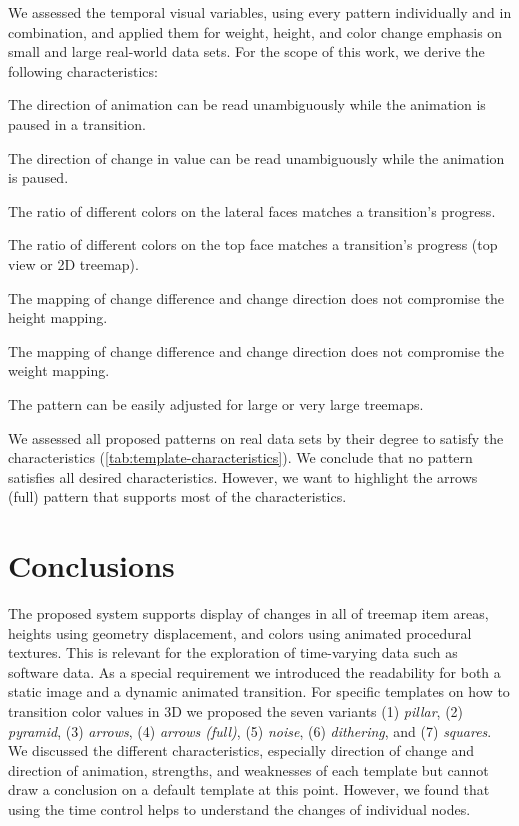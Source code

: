 \documentclass[sigconf%
,natbib=true%
]{acmart}
\begin{document}
We assessed the temporal visual variables, using every pattern individually and in combination, and applied them for weight, height, and color change emphasis on small and large real-world data sets.
For the scope of this work, we derive the following characteristics:
\newlength{\maxlabel}
\begin{description}[itemindent=0mm,labelwidth=20mm,leftmargin=\maxlabel,align=right,itemsep=1mm]
    \item [$\Delta_{\textrm{DirAnim}}$]
        The direction of animation can be read unambiguously while the animation is paused in a transition.
    \item [$\Delta_{\textrm{DirChange}}$]
        The direction of change in value can be read unambiguously while the animation is paused.
    \item [$\Delta_{\textrm{RatioLat}}$]
        The ratio of different colors on the lateral faces matches a transition's progress.
    \item [$\Delta_{\textrm{RatioTop}}$]
        The ratio of different colors on the top face matches a transition's progress (top view or 2D treemap).
    \item [$\Delta_{\textrm{IndHeight}}$]
        The mapping of change difference and change direction does not compromise the height mapping.
    \item [$\Delta_{\textrm{IndWeight}}$]
        The mapping of change difference and change direction does not compromise the weight mapping.
    \item [$\Delta_{\textrm{TreeSize}}$]
        The pattern can be easily adjusted for large or very large treemaps.
\end{description}
We assessed all proposed patterns on real data sets by their degree to satisfy the characteristics (\autoref{tab:template-characteristics}).
We conclude that no pattern satisfies all desired characteristics.
However, we want to highlight the arrows (full) pattern that supports most of the characteristics.

\section{Conclusions} 
The proposed system supports display of changes in all of treemap item areas, heights using geometry displacement, and colors using animated procedural textures.
This is relevant for the exploration of time-varying data such as software data.
As a special requirement we introduced the readability for both a static image and a dynamic animated transition.
For specific templates on how to transition color values in 3D we proposed the seven variants (1) \emph{pillar}, (2) \emph{pyramid}, (3) \emph{arrows}, (4) \emph{arrows (full)}, (5) \emph{noise}, (6) \emph{dithering}, and (7) \emph{squares}.
We discussed the different characteristics, especially direction of change and direction of animation, strengths, and weaknesses of each template but cannot draw a conclusion on a default template at this point.
However, we found that using the time control helps to understand the changes of individual nodes.
\end{document}

